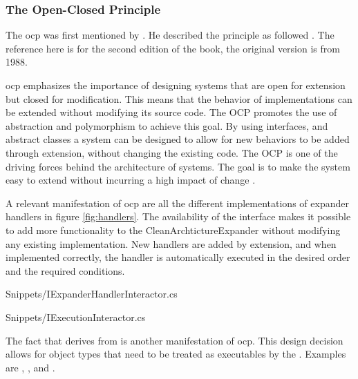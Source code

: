 \subsubsection{The Open-Closed Principle} \label{subsubsec:ocp}

The \gls{ocp} was first mentioned by . He described
the principle as followed \parencite[79]{meyer_object-oriented_1997}. The reference here
is for the second edition of the book, the original version is from 1988.


\gls{ocp} emphasizes the importance of designing systems that are open for extension but
closed for modification. This means that the behavior of implementations can be extended
without modifying its source code. The OCP promotes the use of abstraction and
polymorphism to achieve this goal. By using interfaces, and abstract classes a system can
be designed to allow for new behaviors to be added through extension, without changing the
existing code. The OCP is one of the driving forces	behind the architecture	of systems.
The goal is	to make	the	system easy	to extend without incurring a high impact of change
\parencite[94]{robert_c_martin_clean_2018}.

A relevant manifestation of \gls{ocp} are all the different implementations of expander
handlers in figure \ref{fig:handlers}. The availability of the
 interface makes it possible to add more
functionality to the CleanArchtictureExpander without modifying any existing
implementation. New handlers are added by extension, and when implemented correctly, the
handler is automatically executed in the desired order and the required conditions.


    {Snippets/IExpanderHandlerInteractor.cs}


    {Snippets/IExecutionInteractor.cs}

The fact that  derives from
 is another manifestation of \gls{ocp}. This
design decision allows for object types that need to be treated as executables by the
. Examples are
,
,
 and
. 

